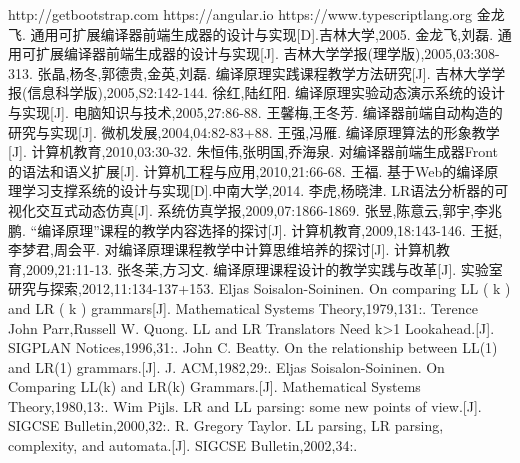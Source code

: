 \documentclass[a4paper]{article}
\newcommand{\小二}{\fontsize{18pt}{\baselineskip}\selectfont}
\newcommand{\小三}{\fontsize{15pt}{\baselineskip}\selectfont}
\newcommand{\小四}{\fontsize{12pt}{\baselineskip}\selectfont}
\begin{document}
\newpage
{}
\begin{thebibliography}{0}
http://getbootstrap.com
https://angular.io
https://www.typescriptlang.org
金龙飞. 通用可扩展编译器前端生成器的设计与实现[D].吉林大学,2005.
金龙飞,刘磊. 通用可扩展编译器前端生成器的设计与实现[J]. 吉林大学学报(理学版),2005,03:308-313.
张晶,杨冬,郭德贵,金英,刘磊. 编译原理实践课程教学方法研究[J]. 吉林大学学报(信息科学版),2005,S2:142-144.
徐红,陆红阳. 编译原理实验动态演示系统的设计与实现[J]. 电脑知识与技术,2005,27:86-88.
王馨梅,王冬芳. 编译器前端自动构造的研究与实现[J]. 微机发展,2004,04:82-83+88.
王强,冯雁. 编译原理算法的形象教学[J]. 计算机教育,2010,03:30-32.
朱恒伟,张明国,乔海泉. 对编译器前端生成器Front的语法和语义扩展[J]. 计算机工程与应用,2010,21:66-68.
王福. 基于Web的编译原理学习支撑系统的设计与实现[D].中南大学,2014.
李虎,杨晓津. LR语法分析器的可视化交互式动态仿真[J]. 系统仿真学报,2009,07:1866-1869.
张昱,陈意云,郭宇,李兆鹏. “编译原理”课程的教学内容选择的探讨[J]. 计算机教育,2009,18:143-146.
王挺,李梦君,周会平. 对编译原理课程教学中计算思维培养的探讨[J]. 计算机教育,2009,21:11-13.
张冬茉,方习文. 编译原理课程设计的教学实践与改革[J]. 实验室研究与探索,2012,11:134-137+153.
Eljas Soisalon-Soininen. On comparing LL ( k ) and LR ( k ) grammars[J]. Mathematical Systems Theory,1979,131:.
Terence John Parr,Russell W. Quong. LL and LR Translators Need k>1 Lookahead.[J]. SIGPLAN Notices,1996,31:.
John C. Beatty. On the relationship between LL(1) and LR(1) grammars.[J]. J. ACM,1982,29:.
Eljas Soisalon-Soininen. On Comparing LL(k) and LR(k) Grammars.[J]. Mathematical Systems Theory,1980,13:.
Wim Pijls. LR and LL parsing: some new points of view.[J]. SIGCSE Bulletin,2000,32:.
R. Gregory Taylor. LL parsing, LR parsing, complexity, and automata.[J]. SIGCSE Bulletin,2002,34:.
\end{thebibliography}

\appendix
\newpage


\newpage

\end{document}
